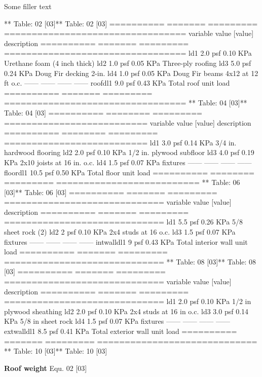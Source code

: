 \documentclass[12pt,notitle,letterpaper]{report}
\begin{document}
\newpage

Some filler text

** Table: 02 {[}03{]}** \hfill   Table: 02 {[}03{]}
==========  =======  =========  =================================
variable      value    {[}value{]}  description
==========  =======  =========  =================================
ld1         2.0 psf   0.10 KPa  Urethane foam (4 inch thick)
ld2         1.0 psf   0.05 KPa  Three-ply roofing
ld3         5.0 psf   0.24 KPa  Doug Fir decking 2-in.
ld4         1.0 psf   0.05 KPa  Doug Fir beams 4x12 at 12 ft o.c.
------       ------     ------  ------
roofdl1     9.0 psf   0.43 KPa  Total roof unit load
==========  =======  =========  =================================
** Table: 04 {[}03{]}** \hfill   Table: 04 {[}03{]}
==========  ========  =========  ==========================
variable       value    {[}value{]}  description
==========  ========  =========  ==========================
ld1          3.0 psf   0.14 KPa  3/4 in. hardwood flooring
ld2          2.0 psf   0.10 KPa  1/2 in. plywood subfloor
ld3          4.0 psf   0.19 KPa  2x10 joists at 16 in. o.c.
ld4          1.5 psf   0.07 KPa  fixtures
------        ------     ------  ------
floordl1    10.5 psf   0.50 KPa  Total floor unit load
==========  ========  =========  ==========================
** Table: 06 {[}03{]}** \hfill   Table: 06 {[}03{]}
==========  =======  =========  =============================
variable      value    {[}value{]}  description
==========  =======  =========  =============================
ld1         5.5 psf   0.26 KPa  5/8\textquotedbl{} sheet rock (2)
ld2           2 psf   0.10 KPa  2x4 studs at 16\textquotedbl{} o.c.
ld3         1.5 psf   0.07 KPa  fixtures
------       ------     ------  ------
intwalldl1    9 psf   0.43 KPa  Total interior wall unit load
==========  =======  =========  =============================
** Table: 08 {[}03{]}** \hfill   Table: 08 {[}03{]}
==========  =======  =========  =============================
variable      value    {[}value{]}  description
==========  =======  =========  =============================
ld1         2.0 psf   0.10 KPa  1/2 in plywood sheathing
ld2         2.0 psf   0.10 KPa  2x4 studs at 16 in o.c.
ld3         3.0 psf   0.14 KPa  5/8 in sheet rock
ld4         1.5 psf   0.07 KPa  fixtures
------       ------     ------  ------
extwalldl1  8.5 psf   0.41 KPa  Total exterior wall unit load
==========  =======  =========  =============================
** Table: 10 {[}03{]}** \hfill   Table: 10 {[}03{]}

\textbf{Roof weight} \hfill  Equ. 02 {[}03{]}
\end{document}
